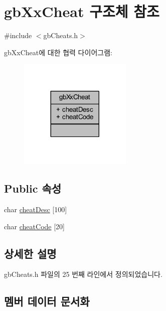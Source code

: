 \hypertarget{structgb_xx_cheat}{}\section{gb\+Xx\+Cheat 구조체 참조}
\label{structgb_xx_cheat}


{\ttfamily \#include $<$gb\+Cheats.\+h$>$}



gb\+Xx\+Cheat에 대한 협력 다이어그램\+:\nopagebreak
\begin{figure}[H]
\begin{center}
\leavevmode
\includegraphics[width=152pt]{structgb_xx_cheat__coll__graph}
\end{center}
\end{figure}
\subsection*{Public 속성}
\begin{DoxyCompactItemize}
\item 
char \mbox{\hyperlink{structgb_xx_cheat_a44a4fb7ecbad404cba31ef24bbf9fa72}{cheat\+Desc}} \mbox{[}100\mbox{]}
\item 
char \mbox{\hyperlink{structgb_xx_cheat_a913e5f0e9db40d08fb4c6133cd313e1f}{cheat\+Code}} \mbox{[}20\mbox{]}
\end{DoxyCompactItemize}


\subsection{상세한 설명}


gb\+Cheats.\+h 파일의 25 번째 라인에서 정의되었습니다.



\subsection{멤버 데이터 문서화}
\mbox{\label{structgb_xx_cheat_a913e5f0e9db40d08fb4c6133cd313e1f}} 
